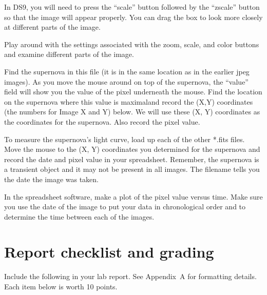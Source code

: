 In DS9, you will need to press the “scale” button followed by the “zscale”
button so that the image will appear properly. You can drag the box to
look more closely at different parts of the image.
\begin{steps}
	\item Play around with the
	settings associated with the zoom, scale, and color buttons and examine
	different parts of the image.
	
	\item Find the supernova in this file (it is in the same location as in the earlier
	jpeg images). As you move the mouse around on top of the supernova,
	the “value” field will show you the value of the pixel underneath the
	mouse. Find the location on the supernova where this value is maximaland record the (X,Y) coordinates (the numbers for Image X and Y)
	below. We will use these (X, Y) coordinates as the coordinates for the
	supernova. Also record the pixel value.
	
	\item To measure the supernova’s light curve, load up each of the other *.fits
	files. Move the mouse to the (X, Y) coordinates you determined for the
	supernova and record the date and pixel value in your spreadsheet. Remember, the
	supernova is a transient object and it may not be present in all images.
	The filename tells you the date the image was taken.
	
	\item In the spreadsheet software, make a plot of the pixel value versus time. Make sure you use
	the date of the image to put your data in chronological order and to
	determine the time between each of the images.
\end{steps}

\section{Report checklist and grading}

Include the following in your lab report. See Appendix~A for formatting details. Each item below is worth 10 points.

